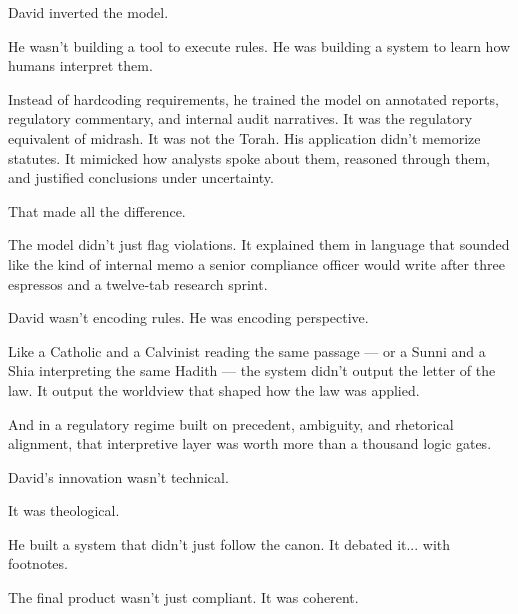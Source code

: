 David inverted the model.

He wasn’t building a tool to execute rules. He was building a system to learn how humans interpret them.

Instead of hardcoding requirements, he trained the model on annotated reports, regulatory commentary, and internal audit narratives.
It was the regulatory equivalent of midrash. It was not the Torah.
His application didn’t memorize statutes. 
It mimicked how analysts spoke about them, reasoned through them, and justified conclusions under uncertainty.

That made all the difference.

The model didn’t just flag violations. 
It explained them in language that sounded like the kind of internal memo a senior compliance officer would write after three espressos and a twelve-tab research sprint.

David wasn’t encoding rules. He was encoding perspective.

Like a Catholic and a Calvinist reading the same passage 
--- or a Sunni and a Shia interpreting the same Hadith --- 
the system didn’t output the letter of the law. 
It output the worldview that shaped how the law was applied.

And in a regulatory regime built on precedent, ambiguity, and rhetorical alignment, 
that interpretive layer was worth more than a thousand logic gates.

David’s innovation wasn’t technical.

It was theological.

He built a system that didn’t just follow the canon.  
It debated it... with footnotes.

The final product wasn’t just compliant.  
It was coherent.

\medskip

